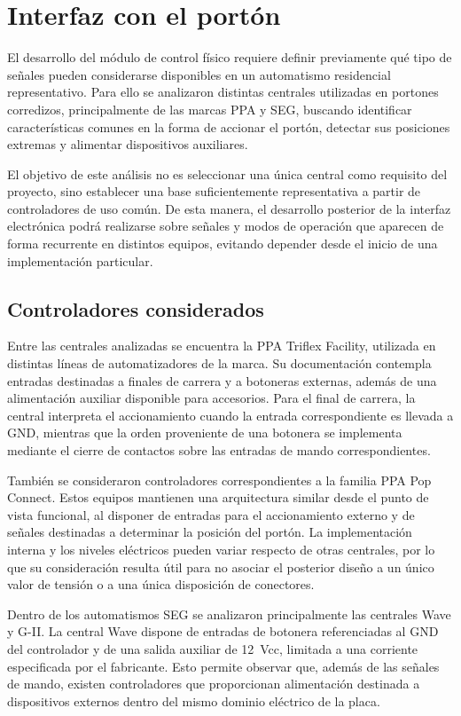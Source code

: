 \chapter{Interfaz con el portón}
\label{cap:interfaz}

El desarrollo del módulo de control físico requiere definir previamente qué tipo de señales pueden considerarse disponibles en un automatismo residencial representativo. Para ello se analizaron distintas centrales utilizadas en portones corredizos, principalmente de las marcas PPA y SEG, buscando identificar características comunes en la forma de accionar el portón, detectar sus posiciones extremas y alimentar dispositivos auxiliares.

El objetivo de este análisis no es seleccionar una única central como requisito del proyecto, sino establecer una base suficientemente representativa a partir de controladores de uso común. De esta manera, el desarrollo posterior de la interfaz electrónica podrá realizarse sobre señales y modos de operación que aparecen de forma recurrente en distintos equipos, evitando depender desde el inicio de una implementación particular.

\section{Controladores considerados}

Entre las centrales analizadas se encuentra la PPA Triflex Facility, utilizada en distintas líneas de automatizadores de la marca. Su documentación contempla entradas destinadas a finales de carrera y a botoneras externas, además de una alimentación auxiliar disponible para accesorios. Para el final de carrera, la central interpreta el accionamiento cuando la entrada correspondiente es llevada a GND, mientras que la orden proveniente de una botonera se implementa mediante el cierre de contactos sobre las entradas de mando correspondientes.

También se consideraron controladores correspondientes a la familia PPA Pop Connect. Estos equipos mantienen una arquitectura similar desde el punto de vista funcional, al disponer de entradas para el accionamiento externo y de señales destinadas a determinar la posición del portón. La implementación interna y los niveles eléctricos pueden variar respecto de otras centrales, por lo que su consideración resulta útil para no asociar el posterior diseño a un único valor de tensión o a una única disposición de conectores.

Dentro de los automatismos SEG se analizaron principalmente las centrales Wave y G-II. La central Wave dispone de entradas de botonera referenciadas al GND del controlador y de una salida auxiliar de 12~Vcc, limitada a una corriente especificada por el fabricante. Esto permite observar que, además de las señales de mando, existen controladores que proporcionan alimentación destinada a dispositivos externos dentro del mismo dominio eléctrico de la placa.

